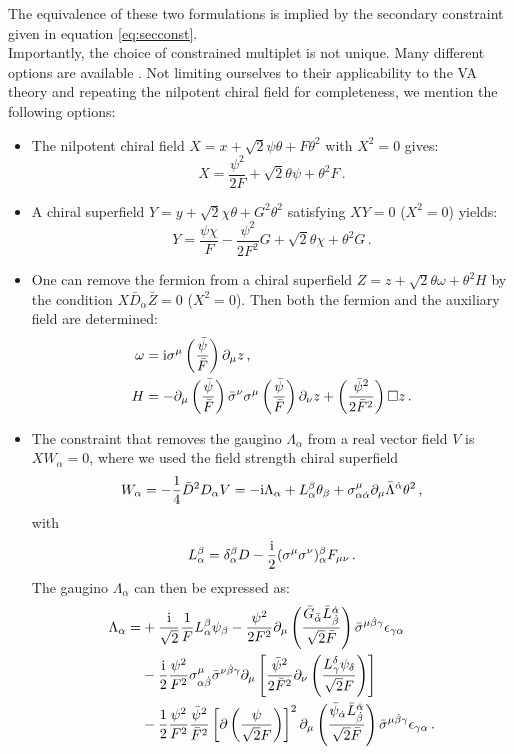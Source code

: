\documentclass[a4paper,12pt]{report}
\newcommand{\be}{\begin{equation}}
\newcommand{\ee}{\end{equation}}
\newcommand{\bea}{\begin{equation}\begin{aligned}}
\newcommand{\eea}{\end{aligned}\end{equation}}
\def\rmi{{\rm i}}
\begin{document}
The equivalence of these two formulations is implied by the secondary constraint given in equation \eqref{eq:secconst}.\\
Importantly, the choice of constrained multiplet is not unique. Many different options are available \cite{Bandos:2016xyu,GarciadelMoral:2017vnz}. Not limiting ourselves to their applicability to the VA theory and repeating the nilpotent chiral field for completeness, we mention the following options:
\begin{itemize}
\item The nilpotent chiral field $X = x + \sqrt{2} \psi \theta + F \theta^2$ with $X^2=0$ gives:
\be 
X = \frac{\psi^2}{2F} + \sqrt{2}\theta \psi + \theta^2 F\,.
\ee
\item A chiral superfield $Y = y + \sqrt{2} \chi \theta + G^2 \theta^2$ satisfying $XY=0$ ($X^ 2 = 0$) yields: 
\be
Y = \frac{\psi \chi}{F} - \frac{\psi^2}{2F^2} G + \sqrt{2}\theta \chi + \theta^2 G\,.
\ee
\item One can remove the fermion from a chiral superfield $Z = z + \sqrt{2} \theta \omega + \theta^2 H$ by the condition $X \bar{D}_{\dot{\alpha}} \bar{Z}=0$ ($X^ 2=0$). Then both the fermion and the auxiliary field are determined:
\bea 
\omega &= \rmi \sigma^\mu \left(\frac{\bar{\psi}}{\bar{F}}\right) \partial_\mu z\,,\\
H &= -\partial_\mu \left(\frac{\bar{\psi}}{\bar{F}}\right) \bar{\sigma}^\nu \sigma^\mu \left(\frac{\bar{\psi}}{\bar{F}}\right) \partial_\nu z + \left(\frac{\bar{\psi}^2}{2\bar{F}^2}\right) \square z\,.
\eea
\item The constraint that removes the gaugino $\Lambda_\alpha$ from a real vector field $V$ is $X W_\alpha = 0$, where we used the field strength chiral superfield
\be 
W_\alpha = -\frac{1}{4} \bar{D}^2 D_\alpha V = - \rmi \Lambda_\alpha + L^\beta_\alpha \theta_\beta + \sigma^\mu_{\alpha\dot{\alpha}} \partial_\mu \bar{\Lambda}^{\dot{\alpha}} \theta^2\,,
\ee
with
\be 
L_\alpha^\beta = \delta^\beta_\alpha D - \frac{\rmi}{2} (\sigma^\mu \sigma^\nu)^\beta_\alpha F_{\mu\nu}\,.
\ee
The gaugino $\Lambda_\alpha$ can then be expressed as:
\bea
\Lambda_\alpha = & + \frac{\rmi}{\sqrt{2}}\frac{1}{F} L_\alpha^\beta \psi_\beta - \frac{\psi^2}{2F^2} \partial_\mu  \left( \frac{\bar{G}_{\bar{\dot{\alpha}}} \bar{L}^{\dot{\alpha}}_{\dot{\beta}}}{\sqrt{2} \bar{F}} \right) \bar{\sigma}^{\mu \dot{\beta}\gamma} \epsilon_{\gamma\alpha}\\
& - \frac{\rmi}{2} \frac{\psi^2}{F^2} \sigma^\mu_{\alpha \dot{\beta}} \bar{\sigma}^{\nu\dot{\beta}\gamma} \partial_\mu \left[ \frac{\bar{\psi}^2}{2 \bar{F}^2} \partial_\nu \left(\frac{L^\delta_\gamma \psi_\delta}{\sqrt{2} F}\right)\right]\\
& - \frac{1}{2} \frac{\psi^2}{F^2} \frac{\bar{\psi}^2}{\bar{F}^2} \left[\partial \left(\frac{\psi}{\sqrt{2}F}\right)\right]^2\partial_\mu \left(\frac{\bar{\psi}_{\dot{\alpha}} \bar{L}^{\dot{\alpha}}_{\dot{\beta}}}{\sqrt{2} \bar{F}}\right) \bar{\sigma}^{\mu\dot{\beta}\gamma} \epsilon_{\gamma \alpha}\,.
\eea
\end{itemize}
\end{document}
